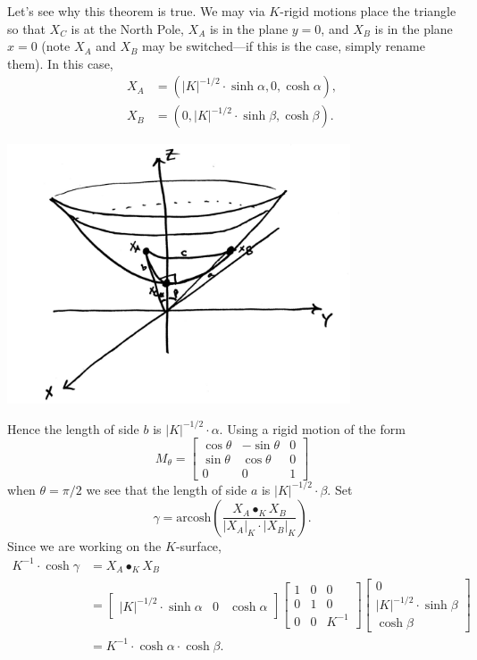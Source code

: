 \documentclass[newpage,hints,handout]{ximera}
\begin{document}
Let's see why this theorem is true.  We may via $K$-rigid motions
place the triangle so that $X_C$ is at the North Pole, $X_A$ is in the
plane $y=0$, and $X_B$ is in the plane $x=0$ (note $X_A$ and $X_B$ may
be switched---if this is the case, simply rename them). In this case,
\begin{align*}
  X_A &= (|K|^{-1/2}\cdot \sinh\alpha, 0, \cosh\alpha),\\
  X_B &= (0, |K|^{-1/2}\cdot \sinh \beta, \cosh\beta).
\end{align*}
\begin{image}
  \includegraphics[width=4in]{hypPythag.png}
\end{image}
Hence the length of side $b$ is $|K|^{-1/2}\cdot\alpha$. Using a rigid motion of the form
\[
M_\theta=
\begin{bmatrix}
  \cos\theta & -\sin\theta & 0\\
  \sin\theta & \cos\theta & 0\\
  0 & 0 & 1
\end{bmatrix}
\]
when $\theta = \pi/2$ we see that the length of side $a$ is $|K|^{-1/2}\cdot
\beta$. Set
\[
\gamma = \mathrm{arcosh}\left(\frac{X_A\bullet_K X_B}{|X_A|_K\cdot |X_B|_K}\right).
\]
Since we are working on the $K$-surface,
\begin{align*}
  K^{-1}\cdot \cosh \gamma &= X_A\bullet_K X_B\\
  &=
  \begin{bmatrix}
    |K|^{-1/2}\cdot \sinh\alpha &  0 & \cosh\alpha
  \end{bmatrix}
    \begin{bmatrix}
      1 & 0 & 0\\
      0 & 1 & 0\\
      0 & 0 & K^{-1}
    \end{bmatrix}
    \begin{bmatrix}
      0\\
      |K|^{-1/2}\cdot\sinh\beta\\
      \cosh\beta
    \end{bmatrix}\\
   &=K^{-1} \cdot \cosh\alpha \cdot \cosh\beta.
  \end{align*}
\end{document}
